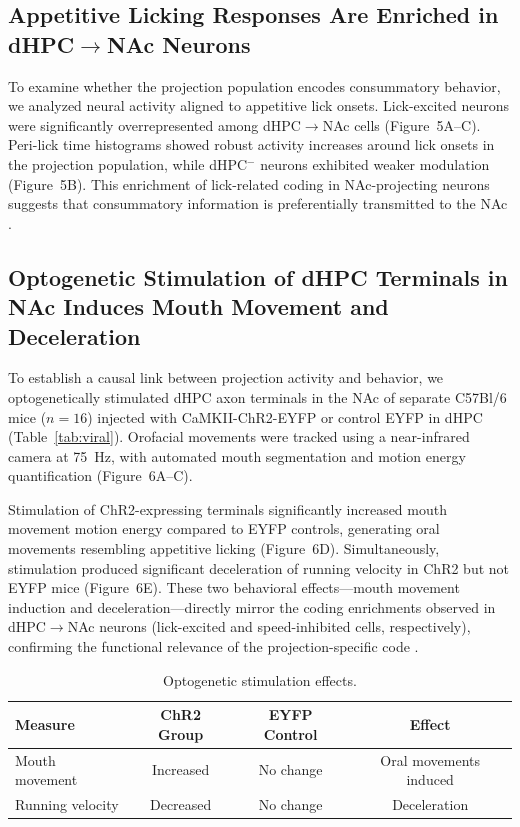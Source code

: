 \documentclass[11pt]{article}
\begin{document}
\subsection{Appetitive Licking Responses Are Enriched in dHPC$\to$NAc Neurons}

To examine whether the projection population encodes consummatory behavior, we analyzed neural activity aligned to appetitive lick onsets. Lick-excited neurons were significantly overrepresented among dHPC$\to$NAc cells (Figure~5A--C). Peri-lick time histograms showed robust activity increases around lick onsets in the projection population, while dHPC$^-$ neurons exhibited weaker modulation (Figure~5B). This enrichment of lick-related coding in NAc-projecting neurons suggests that consummatory information is preferentially transmitted to the NAc \citep{Roitman2005,Saddoris2015}.

\subsection{Optogenetic Stimulation of dHPC Terminals in NAc Induces Mouth Movement and Deceleration}

To establish a causal link between projection activity and behavior, we optogenetically stimulated dHPC axon terminals in the NAc of separate C57Bl/6 mice ($n = 16$) injected with CaMKII-ChR2-EYFP or control EYFP in dHPC (Table~\ref{tab:viral}). Orofacial movements were tracked using a near-infrared camera at 75~Hz, with automated mouth segmentation and motion energy quantification (Figure~6A--C).

Stimulation of ChR2-expressing terminals significantly increased mouth movement motion energy compared to EYFP controls, generating oral movements resembling appetitive licking (Figure~6D). Simultaneously, stimulation produced significant deceleration of running velocity in ChR2 but not EYFP mice (Figure~6E). These two behavioral effects---mouth movement induction and deceleration---directly mirror the coding enrichments observed in dHPC$\to$NAc neurons (lick-excited and speed-inhibited cells, respectively), confirming the functional relevance of the projection-specific code \citep{Britt2012,Stuber2011}.

\begin{table}[H]
\centering
\caption{Optogenetic stimulation effects.}
\label{tab:opto}
\begin{tabular}{lccc}
\toprule
Measure & ChR2 Group & EYFP Control & Effect \\
\midrule
Mouth movement & Increased & No change & Oral movements induced \\
Running velocity & Decreased & No change & Deceleration \\
\bottomrule
\end{tabular}
\end{table}
\end{document}
